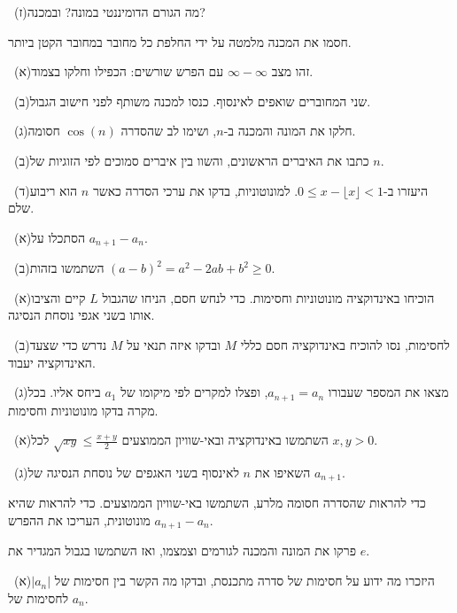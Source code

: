 \documentclass[12pt, a4paper]{article}
\begin{document}
\noindent {}\ (ז)\enskip מה הגורם הדומיננטי במונה? ובמכנה?\par\smallskip
\noindent {}\enskip חסמו את המכנה מלמטה על ידי החלפת כל מחובר במחובר הקטן ביותר.\par\smallskip
\noindent {}\ (א)\enskip זהו מצב $\infty-\infty$ עם הפרש שורשים: הכפילו וחלקו בצמוד.\par\smallskip
\noindent {}\ (ב)\enskip שני המחוברים שואפים לאינסוף. כנסו למכנה משותף לפני חישוב הגבול.\par\smallskip
\noindent {}\ (ג)\enskip חלקו את המונה והמכנה ב-$n$, ושימו לב שהסדרה $\cos(n)$ חסומה.\par\smallskip
\noindent {}\ (ב)\enskip כתבו את האיברים הראשונים, והשוו בין איברים סמוכים לפי הזוגיות של $n$.\par\smallskip
\noindent {}\ (ד)\enskip היעזרו ב-$0\le x-\lfloor x\rfloor<1$. למונוטוניות, בדקו את ערכי הסדרה כאשר $n$ הוא ריבוע שלם.\par\smallskip
\noindent {}\ (א)\enskip הסתכלו על $a_{n+1}-a_n$.\par\smallskip
\noindent {}\ (ב)\enskip השתמשו בזהות $(a-b)^2=a^2-2ab+b^2\ge0$.\par\smallskip
\noindent {}\ (א)\enskip הוכיחו באינדוקציה מונוטוניות וחסימות. כדי לנחש חסם, הניחו שהגבול $L$ קיים והציבו אותו בשני אגפי נוסחת הנסיגה.\par\smallskip
\noindent {}\ (ב)\enskip לחסימות, נסו להוכיח באינדוקציה חסם כללי $M$ ובדקו איזה תנאי על $M$ נדרש כדי שצעד האינדוקציה יעבוד.\par\smallskip
\noindent {}\ (ג)\enskip מצאו את המספר שעבורו $a_{n+1}=a_n$, ופצלו למקרים לפי מיקומו של $a_1$ ביחס אליו. בכל מקרה בדקו מונוטוניות וחסימות.\par\smallskip
\noindent {}\ (א)\enskip השתמשו באינדוקציה ובאי-שוויון הממוצעים $\sqrt{xy}\le\frac{x+y}{2}$ לכל $x,y>0$.\par\smallskip
\noindent {}\ (ג)\enskip השאיפו את $n$ לאינסוף בשני האגפים של נוסחת הנסיגה של $a_{n+1}$.\par\smallskip
\noindent {}\enskip כדי להראות שהסדרה חסומה מלרע, השתמשו באי-שוויון הממוצעים. כדי להראות שהיא מונוטונית, העריכו את ההפרש $a_{n+1}-a_n$.\par\smallskip
\noindent {}\enskip פרקו את המונה והמכנה לגורמים וצמצמו, ואז השתמשו בגבול המגדיר את $e$.\par\smallskip
\noindent {}\ (א)\enskip היזכרו מה ידוע על חסימות של סדרה מתכנסת, ובדקו מה הקשר בין חסימות של $|a_n|$ לחסימות של $a_n$.\par\smallskip
\end{document}
